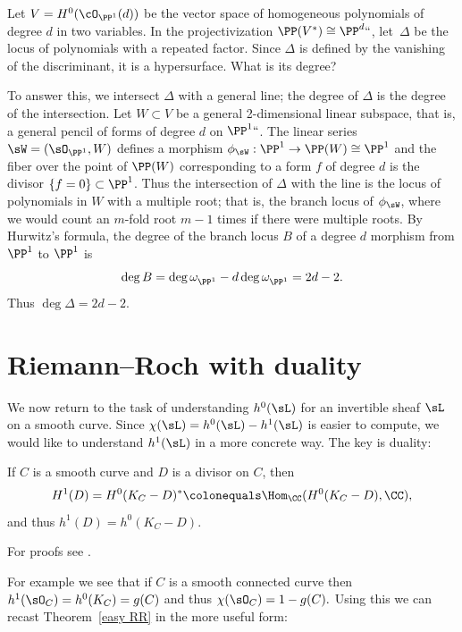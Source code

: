 \begin{example}
Let 
$V= H^0(\cO_{\PP^1}(d))$
be the vector space of  homogeneous polynomials of degree $d$ in
two variables. In the
projectivization $\PP(V^{*}) \cong \PP^d` `$, let~$\Delta$ be the
locus of polynomials with a repeated factor. Since $\Delta$ is
defined by the vanishing of the discriminant, it is a hypersurface.
What is its degree? 
 
To answer this, we intersect $\Delta$ with a general line; the degree
of $\Delta$ is the degree of the intersection.  Let $W\subset V$ be a
general 2-dimensional linear subspace, that is, a general pencil of
forms of degree $d$ on $\PP^1` `$. The linear series $\sW =
(\sO_{\PP^{1}}, W)$ defines a morphism $\phi_{\sW} : \PP^{1} \to
\PP(W) \cong \PP^{1}$ and the fiber over the point of $\PP(W)$
corresponding to a form $f$ of degree $d$ is the divisor $\{f =
0\}\subset \PP^{1}$. Thus the intersection of $\Delta$ with the line
is the locus of polynomials in $W$ with a multiple root; that is, the
branch locus of $\phi_{\sW}$, where we would count an $m$-fold root
$m-1$ times if there were multiple roots. 
 By Hurwitz's formula, the degree of the branch locus $B$ of a 
degree $d$ morphism from $\PP^{1}$ to $\PP^{1}$ is
 $$
 \deg B = \deg \omega^{}_{\PP^{1}} - d\deg \omega^{}_{\PP^{1}} = 2d-2.
 $$
 Thus $\deg \Delta = 2d-2$.
 \end{example}
  

\section{Riemann--Roch with duality}

We now return to the task of understanding $h^0(\sL)$ for an invertible sheaf $\sL$ on a smooth curve. Since $\chi(\sL) = h^0(\sL)-h^1(\sL)$ is easier to compute, we would like to understand $h^1(\sL)$ in a more concrete way. The key is duality:
 
\begin{theorem}\label{sd}
If $C$ is a smooth curve and $D$ is a divisor on $C$, then
%
%
$$
H^1(D) =H^0(K_C-D)^* \colonequals \Hom_\CC(H^0(K_C-D), \CC),
$$
and thus $h^1(D) = h^0(K_C-D)$.
\end{theorem}

For proofs see \cite[Theorem III.5.2 and III.7.6]{Hartshorne1977}. 

For example we see that if $C$ is a smooth connected curve then $h^1 (\sO_C) = h^0(K_C) = g(C)$ and thus $\chi(\sO_C) = 1-g(C).$   
Using this we can recast Theorem~\ref{easy RR}
in the more useful form:

